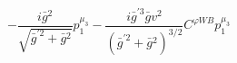 %
\begin{dmath*}
%
  -  \frac{i {\bar g}{}^2}{\sqrt{{\bar g}^{\prime 2} + {\bar g}{}^2}}p_1^{\mu_3}  -  \frac{i {\bar g}^{\prime 3} {\bar g}{} v^2}{\left({\bar g}^{\prime 2} + {\bar g}{}^2\right)^{3/2}}C^{ \varphi  WB} p_1^{\mu_3}
%
\end{dmath*}
%
